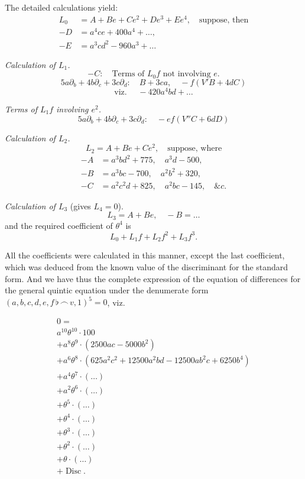 \documentclass[11pt,a4paper]{article}
\theoremstyle{definition}
\DeclareMathOperator{\Disc}{Disc}
\begin{document}
The detailed calculations yield:
\begin{align*}
L_0 &= A+Be+Ce^2+De^3+Ee^4,\quad\text{suppose, then}\\
-D &= a^4ce+400a^4+\ldots,\\
-E &= a^3cd^2-960a^3+\ldots
\end{align*}

\textit{Calculation of $L_1$.}
\[
-C:\quad \text{Terms of }L_0f\text{ not involving }e.
\]
\[
5a\partial_b+4b\partial_c+3c\partial_d:\quad B+3ca,\quad -f(V'B+4dC)
\]
\[
\text{viz. }\quad -420a^4bd+\ldots
\]

\textit{Terms of $L_1f$ involving $e^2$.}
\[
5a\partial_b+4b\partial_c+3c\partial_d:\quad -ef(V''C+6dD)
\]

\textit{Calculation of $L_2$.}
\[
L_2=A+Be+Ce^2,\quad\text{suppose, where}
\]
\begin{align*}
-A &= a^3bd^2+775,\quad a^3d-500,\\
-B &= a^3bc-700,\quad a^2b^2+320,\\
-C &= a^2c^2d+825,\quad a^2bc-145,\quad\&c.
\end{align*}

\textit{Calculation of $L_3$} (gives $L_4=0$).
\[
L_3=A+Be,\quad -B=\ldots
\]
and the required coefficient of $\theta^4$ is
\[
L_0+L_1f+L_2f^2+L_3f^3.
\]

All the coefficients were calculated in this manner, except the last coefficient, which was deduced from the known value of the discriminant for the standard form. And we have thus the complete expression of the equation of differences for the general quintic equation under the denumerate form $(a,b,c,d,e,f\,\flat\,\frown\, v,1)^5=0$, viz.

\vspace{6pt}
\noindent{}

\small
\begin{multline*}
0=\\
a^{10}\theta^{10}\cdot100\\
+a^8\theta^9\cdot(2500ac-5000b^2)\\
+a^6\theta^8\cdot(625a^2c^2+12500a^2bd-12500ab^2c+6250b^4)\\
+a^4\theta^7\cdot(\ldots)\\
+a^2\theta^6\cdot(\ldots)\\
+\theta^5\cdot(\ldots)\\
+\theta^4\cdot(\ldots)\\
+\theta^3\cdot(\ldots)\\
+\theta^2\cdot(\ldots)\\
+\theta\cdot(\ldots)\\
+\Disc.
\end{multline*}
\normalsize
\end{document}
